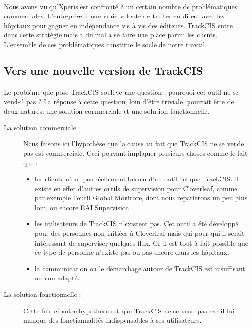 	\paragraph{}
	Nous avons vu qu'Xperis est confronté à un certain nombre de problématiques
	commerciales. L'entreprise à une vraie volonté de traiter en direct avec les
	hôpitaux pour gagner en indépendance vis à vis des éditeurs. TrackCIS entre
	dans cette stratégie mais a du mal à se faire une place parmi les
	clients.\newline
	L'ensemble de ces problématiques constitue le socle de notre travail.
	
	\subsection{Vers une nouvelle version de TrackCIS}
		\paragraph{}%
		Le problème que pose TrackCIS soulève une question : pourquoi cet outil ne se
		vend-il pas ? La réponse à cette question, loin d'être triviale, pourrait
		être de deux natures: une solution commerciale et une solution fonctionnelle.
		\begin{description}
			\item[La solution commerciale : ] Nous faisons ici l'hypothèse que la cause
			au fait que TrackCIS ne se vende pas est commerciale. Ceci pouvant impliquer
			plusieurs choses comme le fait que :
			\begin{itemize}
			  \item les clients n'ont pas réellement besoin d'un outil tel que TrackCIS.
			  Il existe en effet d'autres outils de supervision pour Cloverleaf, comme
			  par exemple l'outil Global Monitore, dont nous reparlerons un peu plus
			  loin, ou encore EAI Supervision.
			  \item les utilisateurs de TrackCIS n'existent pas. Cet outil a été
			  développé pour des personnes non initiées à Cloverleaf mais qui pour qui
			  il serait intéressant de superviser quelques flux.
			  Or il est tout à fait possible que ce type de personne n'existe pas ou pas
			  encore dans les hôpitaux.
			  \item la communication ou le démarchage autour de TrackCIS est insuffisant
			  ou non adapté.
			\end{itemize}
			\item[La solution fonctionnelle : ] Cette fois-ci notre hypothèse est que
			TrackCIS ne se vend pas car il lui manque des fonctionnalités indispensables
			à ses utilisateurs.
		\end{description}
		
